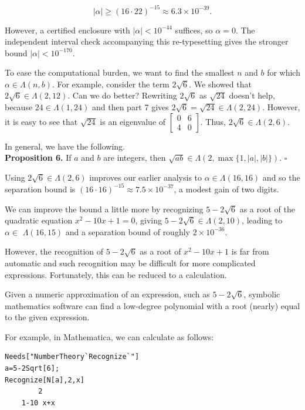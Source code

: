 \documentclass[11pt,letterpaper]{article}
\begin{document}
\[
|\alpha| \geq(16 \cdot 22)^{-15} \approx 6.3 \times 10^{-39} .
\]

However, a certified enclosure with $|\alpha|<10^{-44}$ suffices, so $\alpha=0$. The independent interval check accompanying this re-typesetting gives the stronger bound $|\alpha|<10^{-170}$.

To ease the computational burden, we want to find the smallest $n$ and $b$ for which $\alpha \in \Lambda(n, b)$. For example, consider the term $2 \sqrt{6}$. We showed that $2 \sqrt{6} \in \Lambda(2,12)$. Can we do better? Rewriting $2 \sqrt{6}$ as $\sqrt{24}$ doesn't help, because $24 \in \Lambda(1,24)$ and then part 7 gives $2 \sqrt{6}=\sqrt{24} \in \Lambda(2,24)$. However, it is easy to see that $\sqrt{24}$ is an eigenvalue of $\left[\begin{array}{ll}0 & 6 \\ 4 & 0\end{array}\right]$. Thus, $2 \sqrt{6} \in \Lambda(2,6)$.

In general, we have the following.\\
\noindent\textbf{Proposition 6.} If $a$ and $b$ are integers, then $\sqrt{a b} \in \Lambda(2,\max\{1,|a|,|b|\})$. \(\square\)

Using $2 \sqrt{6} \in \Lambda(2,6)$ improves our earlier analysis to $\alpha \in \Lambda(16,16)$ and so the separation bound is $(16 \cdot 16)^{-15} \approx 7.5 \times 10^{-37}$, a modest gain of two digits.

We can improve the bound a little more by recognizing $5-2 \sqrt{6}$ as a root of the quadratic equation $x^{2}-10 x+1=0$, giving $5-2 \sqrt{6} \in \Lambda(2,10)$, leading to $\alpha \in$ $\Lambda(16,15)$ and a separation bound of roughly $2 \times 10^{-36}$.

However, the recognition of $5-2 \sqrt{6}$ as a root of $x^{2}-10 x+1$ is far from automatic and such recognition may be difficult for more complicated expressions. Fortunately, this can be reduced to a calculation.

Given a numeric approximation of an expression, such as $5-2 \sqrt{6}$, symbolic mathematics software can find a low-degree polynomial with a root (nearly) equal to the given expression.

For example, in Mathematica, we can calculate as follows:

\begin{verbatim}
Needs["NumberTheory`Recognize`"]
a=5-2Sqrt[6];
Recognize[N[a],2,x]
        2
    1-10 x+x
\end{verbatim}
\end{document}

